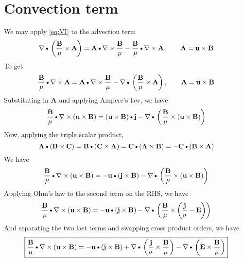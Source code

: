 \documentclass[11pt]{article}
\newcommand{\A}{\mathbf{A}}
\newcommand{\B}{\mathbf{B}}
\newcommand{\C}{\mathbf{C}}
\newcommand{\BM}{\frac{\mathbf{B}}{\mu}}
\newcommand{\J}{\mathbf{j}}
\newcommand{\E}{\mathbf{E}}
\newcommand{\JS}{\frac{\mathbf{j}}{\sigma}}
\newcommand{\U}{\mathbf{u}}
\newcommand{\DOT}{\text{\textbullet}}
\begin{document}
\section{Convection term}
We may apply \ref{eq:VI} to the advection term
\begin{equation}
	\nabla \DOT \left(\BM \times \A \right) = \A \DOT \nabla \times \BM - \BM \DOT \nabla \times \A, \qquad \A = \U \times \B
\end{equation}
To get
\begin{equation}
	\BM \DOT \nabla \times \A = \A \DOT \nabla \times \BM - \nabla \DOT \left(\BM \times \A \right), \qquad \A = \U \times \B
\end{equation}
Substituting in $\A$ and applying Ampere's law, we have
\begin{equation}
	\BM \DOT \nabla \times (\U \times \B) = (\U \times \B) \DOT \J - \nabla \DOT \left(\BM \times (\U \times \B) \right)
\end{equation}
Now, applying the triple scalar product,
\begin{equation}
	\A \DOT (\B \times \C) = \B \DOT (\C \times \A) = \C \DOT (\A \times \B) = - \C \DOT (\B \times \A)
\end{equation}
We have
\begin{equation}
	\BM \DOT \nabla \times (\U \times \B) = -\U \DOT (\J \times \B) - \nabla \DOT \left(\BM \times (\U \times \B) \right)
\end{equation}
Applying Ohm's law to the second term on the RHS, we have
\begin{equation}
	\BM \DOT \nabla \times (\U \times \B) = -
	\U \DOT (\J \times \B) - 
	\nabla \DOT \left(\BM \times \left(\JS - \E \right) \right)
\end{equation}
And separating the two last terms and swapping cross product orders, we have
\begin{equation}
	\boxed{
	\BM \DOT \nabla \times (\U \times \B) = -
	\U \DOT (\J \times \B) + 
	\nabla \DOT \left(\JS \times \BM \right) -
	\nabla \DOT \left(\E \times \BM \right)
	}
\end{equation}
\end{document}
